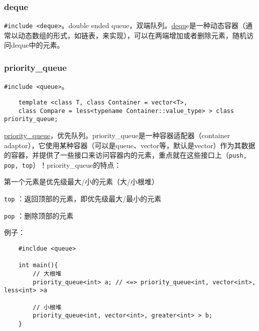 \subsubsection{deque}
\texttt{#include <deque>}。double ended queue，双端队列。\href{https://www.cplusplus.com/reference/deque/deque/?kw=deque}{dequ}e是一种动态容器（通常以动态数组的形式，如链表，来实现），可以在两端增加或者删除元素，随机访问deque中的元素。

\subsubsection{priority\_queue}
\texttt{#include <queue>}。
\begin{verbatim}
	template <class T, class Container = vector<T>,
	class Compare = less<typename Container::value_type> > class priority_queue;
\end{verbatim}
\href{https://www.cplusplus.com/reference/queue/priority_queue/?kw=priority_queue}{priority\_queue}，优先队列。priority\_queue是一种容器适配器（container adaptor），它使用某种容器（可以是queue、vector等，默认是vector）作为其数据的容器，并提供了一些接口来访问容器内的元素，重点就在这些接口上（\texttt{push, pop, top}）！priority\_queue的特点：
\begin{myitemize}
	\item 第一个元素是优先级最大/小的元素（大/小根堆）
	\item \texttt{top} ：返回顶部的元素，即优先级最大/最小的元素
	\item \texttt{pop} ：删除顶部的元素
\end{myitemize}
例子：
\begin{verbatim}
	#incldue <queue>
	
	int main(){
		// 大根堆
		priority_queue<int> a; // <=> priority_queue<int, vector<int>, less<int> >a
		
		// 小根堆
		priority_queue<int, vector<int>, greater<int> > b;
	}
\end{verbatim}


